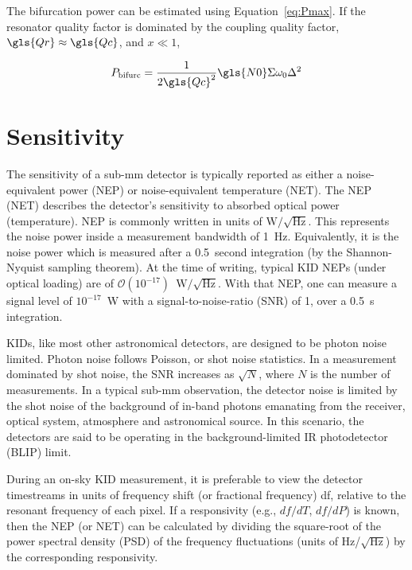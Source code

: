The bifurcation power can be estimated using Equation~\ref{eq:Pmax}. If the resonator quality factor is dominated by the coupling quality factor, $\gls{Qr} \approx \gls{Qc}$, and $x \ll 1$,

\begin{equation} \label{eq:Pbifurc}
  P_{\mathrm{bifurc}} = \frac{1}{2 \gls{Qc}^{2}}\gls{N0}\Sigma \omega_{0}\Delta^{2}
\end{equation}

\section{Sensitivity}\label{sec:sensitivity}

The sensitivity of a sub-mm detector is typically reported as either a noise-equivalent power (NEP) or noise-equivalent temperature (NET). The NEP (NET) describes the detector's sensitivity to absorbed optical power (temperature). NEP is commonly written in units of $\mathrm{W}/\sqrt{\mathrm{Hz}}$. This represents the noise power inside a measurement bandwidth of 1~Hz. Equivalently, it is the noise power which is measured after a 0.5~second integration (by the Shannon-Nyquist sampling theorem). At the time of writing, typical KID NEPs (under optical loading) are of $\mathcal{O}(10^{-17})$~$\mathrm{W}/\sqrt{\mathrm{Hz}}$. With that NEP, one can measure a signal level of $10^{-17}$~W with a signal-to-noise-ratio (SNR) of 1, over a 0.5~s integration.

KIDs, like most other astronomical detectors, are designed to be photon noise limited. Photon noise follows Poisson, or shot noise statistics. In a measurement dominated by shot noise, the SNR increases as $\sqrt{N}$, where $N$ is the number of measurements. In a typical sub-mm observation, the detector noise is limited by the shot noise of the background of in-band photons emanating from the receiver, optical system, atmosphere and astronomical source. In this scenario, the detectors are said to be operating in the background-limited IR photodetector (BLIP) limit.

During an on-sky KID measurement, it is preferable to view the detector timestreams in units of frequency shift (or fractional frequency) \gls{df}, relative to the resonant frequency of each pixel. If a responsivity (e.g., $df/dT$, $df/dP$) is known, then the NEP (or NET) can be calculated by dividing the square-root of the power spectral density (PSD) of the frequency fluctuations (units of Hz/$\sqrt{\mathrm{Hz}}$) by the corresponding responsivity.

